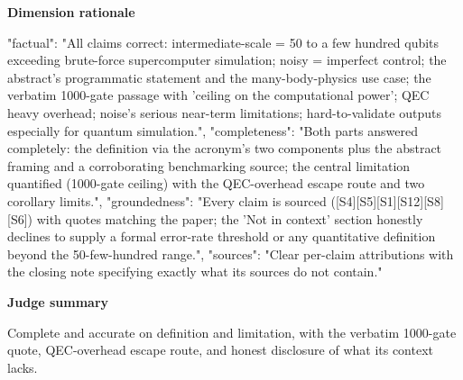 \documentclass[10pt]{article}
\begin{document}
\textbf{Dimension rationale}
\begin{EvidenceText}
{
  "factual": "All claims correct: intermediate-scale = 50 to a few hundred qubits exceeding brute-force supercomputer simulation; noisy = imperfect control; the abstract's programmatic statement and the many-body-physics use case; the verbatim 1000-gate passage with 'ceiling on the computational power'; QEC heavy overhead; noise's serious near-term limitations; hard-to-validate outputs especially for quantum simulation.",
  "completeness": "Both parts answered completely: the definition via the acronym's two components plus the abstract framing and a corroborating benchmarking source; the central limitation quantified (1000-gate ceiling) with the QEC-overhead escape route and two corollary limits.",
  "groundedness": "Every claim is sourced ([S4][S5][S1][S12][S8][S6]) with quotes matching the paper; the 'Not in context' section honestly declines to supply a formal error-rate threshold or any quantitative definition beyond the 50-few-hundred range.",
  "sources": "Clear per-claim attributions with the closing note specifying exactly what its sources do not contain."
}
\end{EvidenceText}

\textbf{Judge summary}
\begin{EvidenceText}
Complete and accurate on definition and limitation, with the verbatim 1000-gate quote, QEC-overhead escape route, and honest disclosure of what its context lacks.
\end{EvidenceText}
\end{document}
